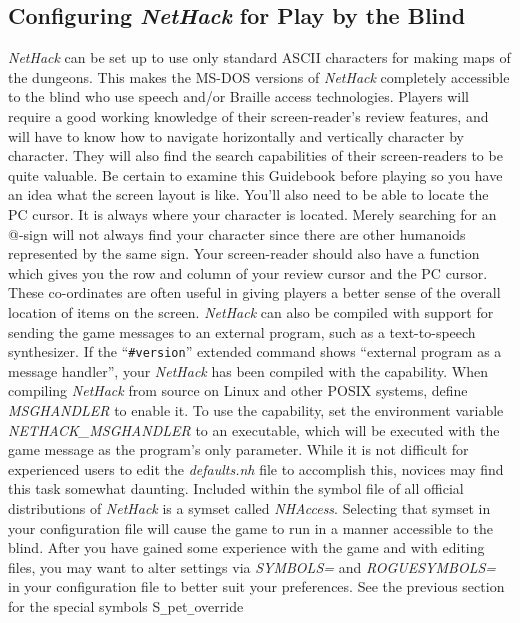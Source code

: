 \subsection*{Configuring {\it NetHack\/} for Play by the Blind}

{\it NetHack\/} can be set up to use only standard ASCII characters for making
maps of the dungeons. This makes the MS-DOS versions of {\it NetHack\/}
completely
accessible to the blind who use speech and/or Braille access technologies.
Players will require a good working knowledge of their screen-reader's
review features, and will have to know how to navigate horizontally and
vertically character by character. They will also find the search
capabilities of their screen-readers to be quite valuable. Be certain to
examine this Guidebook before playing so you have an idea what the screen
layout is like. You'll also need to be able to locate the PC cursor. It is
always where your character is located. Merely searching for an @-sign will
not always find your character since there are other humanoids represented
by the same sign. Your screen-reader should also have a function which
gives you the row and column of your review cursor and the PC cursor.
These co-ordinates are often useful in giving players a better sense of the
overall location of items on the screen.
{\it NetHack\/} can also be compiled with support for sending the game messages
to an external program, such as a text-to-speech synthesizer. If the
``{\tt \#version}'' extended command shows ``external program as a
message handler'', your {\it NetHack\/}
has been compiled with the capability. When compiling {\it NetHack\/}
from source
on Linux and other POSIX systems, define {\it MSGHANDLER\/} to enable it.
To use
the capability, set the environment variable {\it NETHACK\_MSGHANDLER\/} to an
executable, which will be executed with the game message as the program's
only parameter.
While it is not difficult for experienced users to edit the {\it defaults.nh\/}
file to accomplish this, novices may find this task somewhat daunting.
Included within the symbol file of all official distributions of {\it NetHack\/}
is a symset called {\it NHAccess\/}.  Selecting that symset in your
configuration file will cause the game to run in a manner accessible
to the blind. After you have gained some experience with the game
and with editing files, you may want to alter settings via {\it SYMBOLS=\/}
and {\it ROGUESYMBOLS=\/}
in your configuration file to better suit your preferences.
See the previous section for the special symbols S\verb+_+pet\verb+_+override
